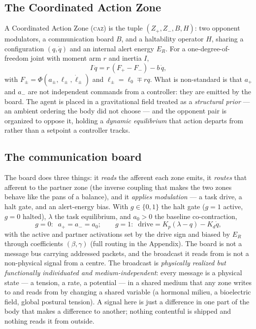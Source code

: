 \documentclass[utf8]{FrontiersinHarvard}
\newcommand{\caz}{\textsc{caz}}
\begin{document}
\subsection{The Coordinated Action Zone}
A Coordinated Action Zone (\caz) is the tuple $(Z_+, Z_-, B, H)$: two opponent modulators, a communication board $B$, and a haltability operator $H$, sharing a configuration $(q,\dot q)$ and an internal alert energy $E_R$. For a one-degree-of-freedom joint with moment arm $r$ and inertia $I$,
\begin{equation}
I\,\ddot q = r\,(F_+ - F_-) - b\,\dot q, \label{eq:joint}
\end{equation}
with $F_\pm = \Phi(a_\pm,\ell_\pm,\dot\ell_\pm)$ and $\ell_\pm = \ell_0 \mp r q$. What is non-standard is that $a_+$ and $a_-$ are not independent commands from a controller: they are emitted by the board. The agent is placed in a gravitational field treated as a \emph{structural prior} --- an ambient ordering the body did not choose --- and the opponent pair is organized to oppose it, holding a \emph{dynamic equilibrium} that action departs from rather than a setpoint a controller tracks.

\subsection{The communication board}
The board does three things: it \emph{reads} the afferent each zone emits, it \emph{routes} that afferent to the partner zone (the inverse coupling that makes the two zones behave like the pans of a balance), and it \emph{applies modulation} --- a task drive, a halt gate, and an alert-energy bias. With $g\in\{0,1\}$ the halt gate ($g=1$ active, $g=0$ halted), $\lambda$ the task equilibrium, and $a_0>0$ the baseline co-contraction,
\begin{equation}
g=0:\;\; a_+=a_-=a_0; \qquad
g=1:\;\; \text{drive}=K_p(\lambda-q)-K_d\dot q, \label{eq:drive}
\end{equation}
with the active and partner activations set by the drive sign and biased by $E_R$ through coefficients $(\beta,\gamma)$ (full routing in the Appendix). The board is not a message bus carrying addressed packets, and the broadcast it reads from is not a non-physical signal from a centre. The broadcast is \emph{physically realized but functionally individuated and medium-independent}: every message is a physical state --- a tension, a rate, a potential --- in a shared medium that any zone writes to and reads from by changing a shared variable (a hormonal milieu, a bioelectric field, global postural tension). A signal here is just a difference in one part of the body that makes a difference to another; nothing contentful is shipped and nothing reads it from outside.
\end{document}
